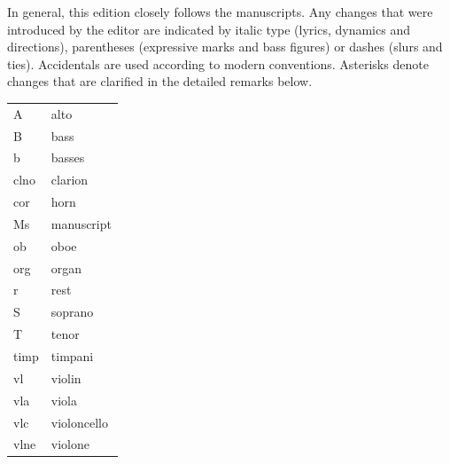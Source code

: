 \documentclass[parskip=full]{scrreprt}
\providecommand\printcriticalnotes{}
\providecommand\setscorelayout{}
\providecommand\printscores{}
\begin{document}
\cleardoublepage
\tableofcontents
\cleardoublepage



In general, this edition closely follows the manuscripts. Any changes that were introduced by the editor are indicated by italic type (lyrics, dynamics and directions), parentheses (expressive marks and bass figures) or dashes (slurs and ties). Accidentals are used according to modern conventions. Asterisks denote changes that are clarified in the detailed remarks below.


\begin{tabular}{@{} l l}
  A    & alto \\
  B    & bass \\
  b    & basses \\
  clno & clarion \\
  cor  & horn \\
  Ms   & manuscript \\
  ob   & oboe \\
  org  & organ \\
  r    & rest \\
  S    & soprano \\
  T    & tenor \\
  timp & timpani \\
  vl   & violin \\
  vla  & viola \\
  vlc  & violoncello \\
  vlne & violone \\
\end{tabular}

\printcriticalnotes
\fi %

\setscorelayout
\printscores
\end{document}
